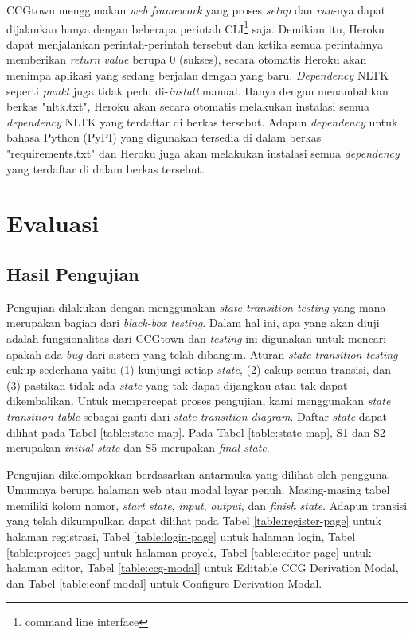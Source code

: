 CCGtown menggunakan \textit{web framework} yang proses \textit{setup} dan \textit{run}-nya
dapat dijalankan hanya dengan beberapa perintah CLI\footnote{command line interface} saja.
Demikian itu, Heroku dapat menjalankan perintah-perintah tersebut dan ketika semua perintahnya
memberikan \textit{return value} berupa $0$ (sukses), secara otomatis Heroku akan menimpa
aplikasi yang sedang berjalan dengan yang baru. \textit{Dependency} NLTK seperti \textit{punkt}
juga tidak perlu di-\textit{install} manual. Hanya dengan menambahkan berkas "nltk.txt",
Heroku akan secara otomatis melakukan instalasi semua \textit{dependency} NLTK yang terdaftar di
berkas tersebut. Adapun \textit{dependency} untuk bahasa Python (PyPI) yang digunakan tersedia di
dalam berkas "requirements.txt" dan Heroku juga akan melakukan instalasi semua \textit{dependency}
yang terdaftar di dalam berkas tersebut.



\section{Evaluasi}

\subsection{Hasil Pengujian}

Pengujian dilakukan dengan menggunakan \textit{state transition testing} yang mana merupakan bagian
dari \textit{black-box testing}. Dalam hal ini, apa yang akan diuji adalah fungsionalitas dari
CCGtown dan \textit{testing} ini digunakan untuk mencari apakah ada \textit{bug} dari sistem yang
telah dibangun. Aturan \textit{state transition testing} cukup sederhana yaitu
(1) kunjungi setiap \textit{state}, (2) cakup semua transisi, dan (3) pastikan tidak ada
\textit{state} yang tak dapat dijangkau atau tak dapat dikembalikan\citep{black2016pragmatic}.
Untuk mempercepat proses pengujian, kami menggunakan \textit{state transition table} sebagai ganti
dari \textit{state transition diagram}. Daftar \textit{state} dapat dilihat pada Tabel
\ref{table:state-map}. Pada Tabel \ref{table:state-map}, S1 dan S2 merupakan \textit{initial state}
dan S5 merupakan \textit{final state}.

Pengujian dikelompokkan berdasarkan antarmuka yang dilihat oleh pengguna. Umumnya berupa halaman web
atau modal layar penuh. Masing-masing tabel memiliki kolom nomor, \textit{start state},
\textit{input}, \textit{output}, dan \textit{finish state}. Adapun transisi yang telah dikumpulkan
dapat dilihat pada Tabel \ref{table:register-page} untuk halaman registrasi, Tabel
\ref{table:login-page} untuk halaman login, Tabel \ref{table:project-page} untuk halaman proyek,
Tabel \ref{table:editor-page} untuk halaman editor, Tabel \ref{table:ccg-modal} untuk Editable CCG
Derivation Modal, dan Tabel \ref{table:conf-modal} untuk Configure Derivation Modal.


